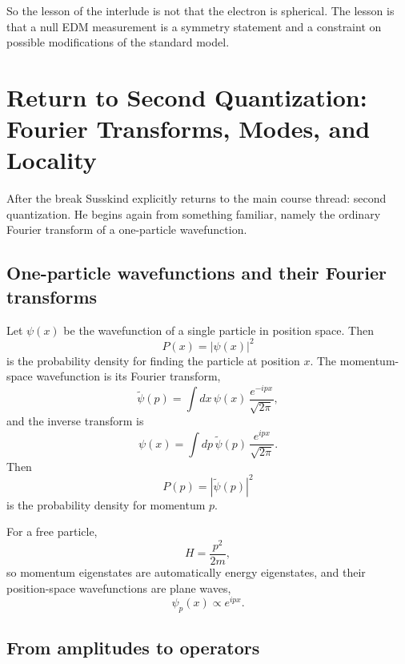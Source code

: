 So the lesson of the interlude is not that the electron is spherical. The lesson is that a null EDM measurement is a symmetry statement and a constraint on possible modifications of the standard model.

\section{Return to Second Quantization: Fourier Transforms, Modes, and Locality}

After the break Susskind explicitly returns to the main course thread: second quantization. He begins again from something familiar, namely the ordinary Fourier transform of a one-particle wavefunction.

\subsection{One-particle wavefunctions and their Fourier transforms}

Let \(\psi(x)\) be the wavefunction of a single particle in position space. Then
\begin{equation}
P(x)=|\psi(x)|^2
\end{equation}
is the probability density for finding the particle at position \(x\). The momentum-space wavefunction is its Fourier transform,
\begin{equation}
\tilde{\psi}(p)=\int dx\,\psi(x)\,\frac{e^{-ipx}}{\sqrt{2\pi}},
\end{equation}
and the inverse transform is
\begin{equation}
\psi(x)=\int dp\,\tilde{\psi}(p)\,\frac{e^{ipx}}{\sqrt{2\pi}}.
\end{equation}
Then
\begin{equation}
P(p)=|\tilde{\psi}(p)|^2
\end{equation}
is the probability density for momentum \(p\).

For a free particle,
\begin{equation}
H=\frac{p^2}{2m},
\end{equation}
so momentum eigenstates are automatically energy eigenstates, and their position-space wavefunctions are plane waves,
\begin{equation}
\psi_p(x)\propto e^{ipx}.
\end{equation}

\subsection{From amplitudes to operators}

